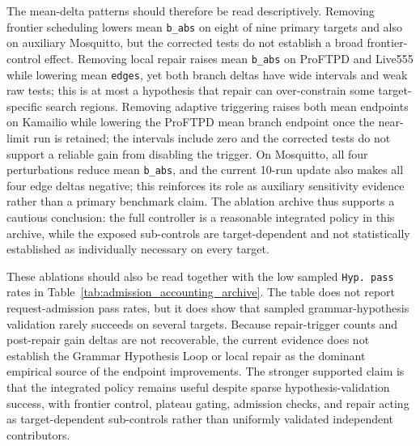 \documentclass[final,5p,times,number]{elsarticle}
\begin{document}
The mean-delta patterns should therefore be read descriptively. Removing frontier scheduling lowers mean \texttt{b\_abs} on eight of nine primary targets and also on auxiliary Mosquitto, but the corrected tests do not establish a broad frontier-control effect. Removing local repair raises mean \texttt{b\_abs} on ProFTPD and Live555 while lowering mean \texttt{edges}, yet both branch deltas have wide intervals and weak raw tests; this is at most a hypothesis that repair can over-constrain some target-specific search regions. Removing adaptive triggering raises both mean endpoints on Kamailio while lowering the ProFTPD mean branch endpoint once the near-limit run is retained; the intervals include zero and the corrected tests do not support a reliable gain from disabling the trigger. On Mosquitto, all four perturbations reduce mean \texttt{b\_abs}, and the current 10-run update also makes all four edge deltas negative; this reinforces its role as auxiliary sensitivity evidence rather than a primary benchmark claim. The ablation archive thus supports a cautious conclusion: the full controller is a reasonable integrated policy in this archive, while the exposed sub-controls are target-dependent and not statistically established as individually necessary on every target.

These ablations should also be read together with the low sampled \texttt{Hyp. pass} rates in Table~\ref{tab:admission_accounting_archive}. The table does not report request-admission pass rates, but it does show that sampled grammar-hypothesis validation rarely succeeds on several targets. Because repair-trigger counts and post-repair gain deltas are not recoverable, the current evidence does not establish the Grammar Hypothesis Loop or local repair as the dominant empirical source of the endpoint improvements. The stronger supported claim is that the integrated policy remains useful despite sparse hypothesis-validation success, with frontier control, plateau gating, admission checks, and repair acting as target-dependent sub-controls rather than uniformly validated independent contributors.
\end{document}
